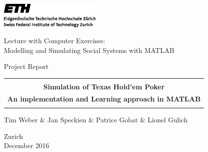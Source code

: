 
\thispagestyle{empty}

\begin{center}
\includegraphics[width=5cm]{ETHlogo.eps}

\bigskip


\bigskip


\bigskip


\LARGE{ 	Lecture with Computer Exercises:\\ }
\LARGE{ Modelling and Simulating Social Systems with MATLAB\\}

\bigskip

\bigskip

\small{Project Report}\\

\bigskip

\bigskip

\bigskip

\bigskip


\begin{tabular}{|c|}
\hline
\\
\textbf{\LARGE{Simulation of Texas Hold'em Poker}}\\
\textbf{\LARGE{An implementation and Learning approach in MATLAB }}\\
\\
\hline
\end{tabular}
\bigskip

\bigskip

\bigskip

\LARGE{Tim Weber \& Jan Speckien \& Patrice Gobat \& Lionel Gulich}



\bigskip

\bigskip

\bigskip

\bigskip

\bigskip

\bigskip

\bigskip

\bigskip

Zurich\\
December 2016\\

\end{center}


